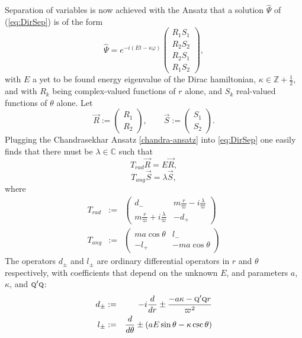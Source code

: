 \documentclass[11 pt]{article}
\newcommand\bbZ{{\mathbb{Z}}}
\renewcommand\({\left(}
\renewcommand\){\right)}
\newcommand\<{\langle}
\renewcommand\>{\rangle}
\newcommand\8{\infty}
\newcommand\beq{\begin{equation}}
\newcommand\eeq{\end{equation}}
\newcommand{\la} {\lambda}\newcommand{\La}{\Lambda}
\newcommand{\C}{\mathbb{C}}
\newcommand{\De}{\varpi}
\newcommand{\bna}{\begin{eqnarray}}
\newcommand{\ena}{\end{eqnarray}}
\begin{document}
  Separation of variables is now achieved with the Ansatz that a solution $\hat{\Psi}$ of (\ref{eq:DirSep}) is of the form
\beq\label{chandra-ansatz} 
\hat{\Psi} = e^{-i(Et-\kappa \varphi)} \left( \begin{array}{c}R_1S_1\\ R_2 S_2\\ R_2 S_1\\ R_1 S_2 \end{array}\right),
\eeq
with $E$ a yet to be found energy eigenvalue of the Dirac hamiltonian, $\kappa \in \bbZ + \frac12$, and with
 $R_k$ being complex-valued functions of $r$ alone, and $S_k$ real-valued functions of $\theta$ alone.  
Let
\beq
\vec{R} := \left(\begin{array}{c} R_1\\ R_2\end{array}\right),\qquad \vec{S} := \left(\begin{array}{c} S_1\\ S_2\end{array}\right).
\eeq
Plugging the Chandrasekhar Ansatz \eqref{chandra-ansatz} into \eqref{eq:DirSep} one easily finds that there must be 
$\la\in\C$ such that 
\beq\label{eq:rad} 
T_{rad}\vec{R} =  E\vec{R},
\eeq
\beq\label{eq:ang}
T_{ang}\vec{S} = \la \vec{S},
\eeq
where
\bna
T_{rad} & :=  \label{eq:Trad} 
& \left(\begin{array}{cc} d_- 
&m\frac{r}{\De} - i\frac{\la}{\De} \\ m\frac{r}{\De}+i\frac{\la}{\De} 
& -d_+ \end{array}\right)
\\
T_{ang}& := \label{eq:Tang} 
& \left(\begin{array}{cc}  ma\cos\theta & l_- \\
 -l_+ &-ma\cos\theta  \end{array}\right)
\ena
The operators $d_\pm$ and $l_\pm$ are ordinary differential operators in $r$ and $\theta$ respectively, 
with coefficients that depend on the unknown $E$, and parameters $a$, $\kappa$, and $\textsc{q}'\textsc{q}$:
\bna\label{opdefsA}
d_\pm & := & -i \frac{d}{dr} \pm \frac{-a\kappa - \textsc{q}'\textsc{q} r}{\De^2}\\
l_\pm & := & \frac{d}{d\theta} \pm \left( aE\sin\theta - \kappa \csc\theta\right)\label{opdefsB}
\ena
 
\end{document}

